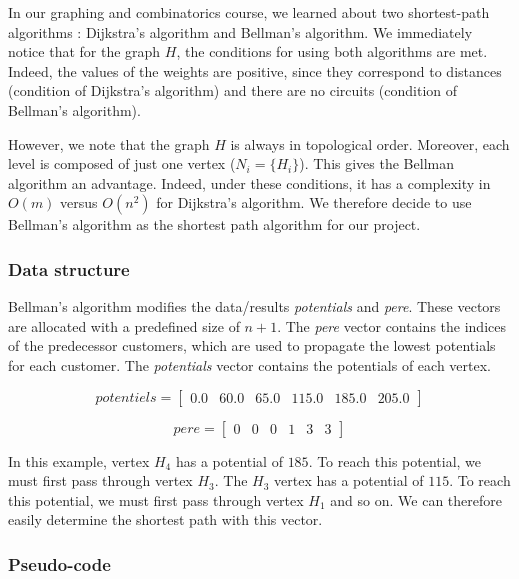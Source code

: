 In our graphing and combinatorics course, we learned about two shortest-path algorithms : Dijkstra's algorithm and Bellman's algorithm. We immediately notice that for the graph $H$, the conditions for using both algorithms are met. Indeed, the values of the weights are positive, since they correspond to distances (condition of Dijkstra's algorithm) and there are no circuits (condition of Bellman's algorithm).

However, we note that the graph $H$ is always in topological order. Moreover, each level is composed of just one vertex ($N_i = \{ H_i \}$). This gives the Bellman algorithm an advantage. Indeed, under these conditions, it has a complexity in $O(m)$ versus $O(n^2)$ for Dijkstra's algorithm. We therefore decide to use Bellman's algorithm as the shortest path algorithm for our project.

\subsubsection{Data structure}

Bellman's algorithm modifies the data/results \textit{potentials} and \textit{pere}. These vectors are allocated with a predefined size of $n+1$. The \textit{pere} vector contains the indices of the predecessor customers, which are used to propagate the lowest potentials for each customer. The \textit{potentials} vector contains the potentials of each vertex.

\begin{displaymath}
potentiels = \begin{bmatrix}
0.0 & 60.0 & 65.0 & 115.0 & 185.0 & 205.0
\end{bmatrix}
\end{displaymath}

\begin{displaymath}
pere = \begin{bmatrix}
0 & 0 & 0 & 1 & 3 & 3
\end{bmatrix}
\end{displaymath}

In this example, vertex $H_4$ has a potential of $185$. To reach this potential, we must first pass through vertex $H_3$. The $H_3$ vertex has a potential of $115$. To reach this potential, we must first pass through vertex $H_1$ and so on. We can therefore easily determine the shortest path with this vector.

\subsubsection{Pseudo-code}

